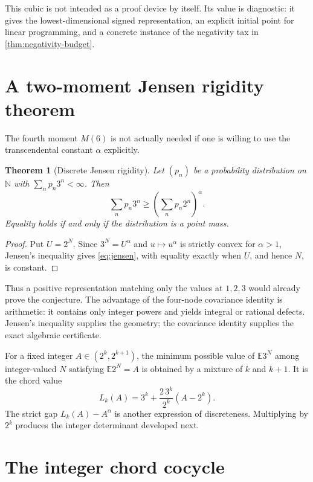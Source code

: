 \documentclass[11pt]{article}
\newtheorem{theorem}{Theorem}[section]
\theoremstyle{definition}
\newcommand{\N}{\mathbb N}
\newcommand{\E}{\mathbb E}
\begin{document}
This cubic is not intended as a proof device by itself.  Its value is diagnostic: it gives the lowest-dimensional signed representation, an explicit initial point for linear programming, and a concrete instance of the negativity tax in \cref{thm:negativity-budget}.

\section{A two-moment Jensen rigidity theorem}\label{sec:jensen}

The fourth moment $M(6)$ is not actually needed if one is willing to use the transcendental constant $\alpha$ explicitly.

\begin{theorem}[Discrete Jensen rigidity]\label{thm:jensen}
Let $(p_n)$ be a probability distribution on $\N$ with $\sum_np_n3^n<\infty$.  Then
\begin{equation}\label{eq:jensen}
 \sum_np_n3^n\ge\left(\sum_np_n2^n\right)^\alpha.
\end{equation}
Equality holds if and only if the distribution is a point mass.
\end{theorem}
\begin{proof}
Put $U=2^N$.  Since $3^N=U^\alpha$ and $u\mapsto u^\alpha$ is strictly convex for $\alpha>1$, Jensen's inequality gives \eqref{eq:jensen}, with equality exactly when $U$, and hence $N$, is constant.
\end{proof}

Thus a positive representation matching only the values at $1,2,3$ would already prove the conjecture.  The advantage of the four-node covariance identity is arithmetic: it contains only integer powers and yields integral or rational defects.  Jensen's inequality supplies the geometry; the covariance identity supplies the exact algebraic certificate.

For a fixed integer $A\in(2^k,2^{k+1})$, the minimum possible value of $\E 3^N$ among integer-valued $N$ satisfying $\E2^N=A$ is obtained by a mixture of $k$ and $k+1$.  It is the chord value
\begin{equation}\label{eq:chord}
 L_k(A)=3^k+\frac{2\,3^k}{2^k}(A-2^k).
\end{equation}
The strict gap $L_k(A)-A^\alpha$ is another expression of discreteness.  Multiplying by $2^k$ produces the integer determinant developed next.

\section{The integer chord cocycle}\label{sec:cocycle}
\end{document}
